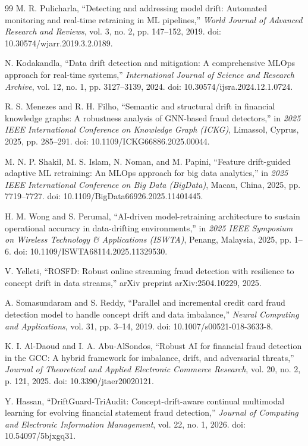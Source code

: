 \begin{thebibliography}{99}
M. R. Pulicharla, ``Detecting and addressing model drift: Automated monitoring and real-time retraining in ML pipelines,'' \textit{World Journal of Advanced Research and Reviews}, vol. 3, no. 2, pp. 147--152, 2019. doi: 10.30574/wjarr.2019.3.2.0189.

N. Kodakandla, ``Data drift detection and mitigation: A comprehensive MLOps approach for real-time systems,'' \textit{International Journal of Science and Research Archive}, vol. 12, no. 1, pp. 3127--3139, 2024. doi: 10.30574/ijsra.2024.12.1.0724.

R. S. Menezes and R. H. Filho, ``Semantic and structural drift in financial knowledge graphs: A robustness analysis of GNN-based fraud detectors,'' in \textit{2025 IEEE International Conference on Knowledge Graph (ICKG)}, Limassol, Cyprus, 2025, pp. 285--291. doi: 10.1109/ICKG66886.2025.00044.

M. N. P. Shakil, M. S. Islam, N. Noman, and M. Papini, ``Feature drift-guided adaptive ML retraining: An MLOps approach for big data analytics,'' in \textit{2025 IEEE International Conference on Big Data (BigData)}, Macau, China, 2025, pp. 7719--7727. doi: 10.1109/BigData66926.2025.11401445.

H. M. Wong and S. Perumal, ``AI-driven model-retraining architecture to sustain operational accuracy in data-drifting environments,'' in \textit{2025 IEEE Symposium on Wireless Technology \& Applications (ISWTA)}, Penang, Malaysia, 2025, pp. 1--6. doi: 10.1109/ISWTA68114.2025.11329530.

V. Yelleti, ``ROSFD: Robust online streaming fraud detection with resilience to concept drift in data streams,'' arXiv preprint arXiv:2504.10229, 2025.

A. Somasundaram and S. Reddy, ``Parallel and incremental credit card fraud detection model to handle concept drift and data imbalance,'' \textit{Neural Computing and Applications}, vol. 31, pp. 3--14, 2019. doi: 10.1007/s00521-018-3633-8.

K. I. Al-Daoud and I. A. Abu-AlSondos, ``Robust AI for financial fraud detection in the GCC: A hybrid framework for imbalance, drift, and adversarial threats,'' \textit{Journal of Theoretical and Applied Electronic Commerce Research}, vol. 20, no. 2, p. 121, 2025. doi: 10.3390/jtaer20020121.

Y. Hassan, ``DriftGuard-TriAudit: Concept-drift-aware continual multimodal learning for evolving financial statement fraud detection,'' \textit{Journal of Computing and Electronic Information Management}, vol. 22, no. 1, 2026. doi: 10.54097/5bjxgq31.


\end{thebibliography}
